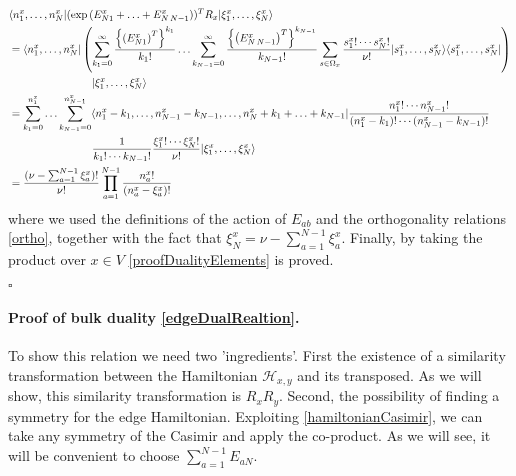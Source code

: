 \documentclass[10pt]{article}
\numberwithin{equation}{section}
\numberwithin{equation}{subsection}
\begin{document}
\begin{align}
&\langle n_{1}^{x},\ldots,n_{N}^{x}|(\exp{(E_{N1}^{x}+\ldots+E_{N\,N-1}^{x})})^{T}R_{x}|\xi_{1}^{x},\ldots,\xi_{N}^{x}\rangle\nonumber\\&= \langle  n_{1}^{x},\ldots,n_{N}^{x}|\left(\sum_{k_{1}=0}^{\infty}\frac{\left\{\left(E_{N1}^{x}\right)^{T}\right\}^{k_{1}}}{k_{1}!}\ldots\sum_{k_{N-1}=0}^{\infty}\frac{\left\{\left(E_{N\,N-1}^{x}\right)^{T}\right\}^{k_{N-1}}}{k_{N-1}!}\sum_{s\in\Omega_{x}}\frac{s_{1}^{x}!\cdots s_{N}^{x}!}{\nu!}|s_{1}^{x},\ldots,s_{N}^{x}\rangle\langle s_{1}^{x},\ldots,s_{N}^{x}|\right)\nonumber
\\&
\hspace{2.cm}\qquad|\xi_{1}^{x},\ldots,\xi_{N}^{x}\rangle\nonumber
\\&=
\sum_{k_{1}=0}^{n_{1}^{x}}\ldots\sum_{k_{N-1}=0}^{n_{N-1}^{x}}\langle n_{1}^{x}-k_{1},\ldots,n_{N-1}^{x}-k_{N-1},\ldots,n_{N}^{x}+k_{1}+\ldots+k_{N-1}|\frac{n_{1}^{x}!\cdots n_{N-1}^{x}!}{(n_{1}^{x}-k_{1})!\cdots(n_{N-1}^{x}-k_{N-1})!}\nonumber
\\& 
\hspace{2.cm}\qquad\frac{1}{k_{1}!\cdots k_{N-1}!}\frac{\xi_{1}^{x}!\cdots \xi_{N}^{x}!}{\nu!}|\xi_{1}^{x},\ldots,\xi_{N}^{x}\rangle\nonumber
\\&=
\frac{(\nu-\sum_{a=1}^{N-1}\xi_{a}^{x})!}{\nu!}\prod_{a=1}^{N-1}\frac{n_{a}^{x}!}{(n_{a}^{x}-\xi_{a}^{x})!}
\end{align}
where we used the definitions of the action of $E_{ab}$  and the orthogonality relations \eqref{ortho}, together with the fact that $\xi_{N}^{x}=\nu-\sum_{a=1}^{N-1}\xi_{a}^{x}$. 
Finally, by taking the product over $x\in V$ \eqref{proofDualityElements} is proved.
\begin{flushright}
    $\square$
\end{flushright}


\paragraph{Proof of bulk duality \eqref{edgeDualRealtion}.}To show this relation we need two 'ingredients'. First the existence of a similarity transformation between the Hamiltonian $\mathcal{H}_{x,y}$  and its transposed. As we will show, this similarity transformation is $R_{x}R_{y}$.  Second, the possibility of finding a symmetry for the edge Hamiltonian. Exploiting \eqref{hamiltonianCasimir}, we can take any symmetry of the Casimir and apply the co-product. As we will see, it will be convenient to choose $\sum_{a=1}^{N-1}E_{aN}$. 
\end{document}
